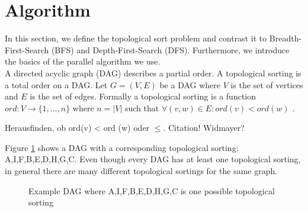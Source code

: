 
\section{Algorithm}\label{sec:background}

 In this section, we define the topological sort problem and contrast it to Breadth-First-Search (BFS) and Depth-First-Search (DFS).
 Furthermore, we introduce the basics of the parallel algorithm we use.
 \\
 

 A directed acyclic graph (DAG) describes a partial order. A topological sorting is a total order on a DAG. Let $G = (V,E)$ be a DAG where $V$ is the set of vertices and $E$ is the set of edges. Formally a topological sorting is a function $ord: V \longrightarrow \{1,...,n\}$ where $n = |V|$ such that $\forall (v,w) \in E: ord(v) < ord(w)$ \cite[Chapter~9.1]{ottmann2012algorithmen}.
\begin{invisible}
Herausfinden, ob ord(v) < ord (w) oder $\leq$. Citation! Widmayer?
\end{invisible}

Figure \ref{fig:ts-example} shows a DAG with a corresponding topological sorting: A,I,F,B,E,D,H,G,C. Even though every DAG has at least one topological sorting, in general there are many different topological sortings for the same graph.

\begin{figure}[!hbp]
 \centering

\caption{Example DAG where A,I,F,B,E,D,H,G,C is one possible topological sorting}
\label{fig:ts-example}
\end{figure}

